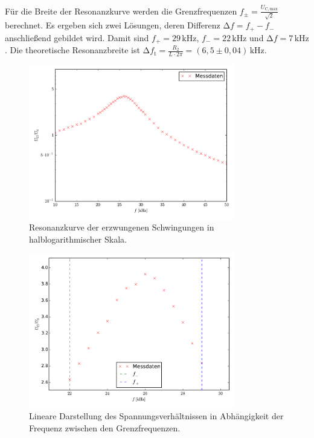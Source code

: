Für die Breite der Resonanzkurve werden die Grenzfrequenzen $f_\pm=\frac{U_\mathup{C,max}}{\sqrt{2}}$ berechnet. Es ergeben sich zwei Lösungen, deren Differenz $\mathup{\Delta}{f}=f_+-f_-$ anschließend gebildet wird. 
Damit sind $f_+=29\,\si{\kilo\hertz}$, $f_-=22\,\si{\kilo\hertz}$ und $\mathup{\Delta}{f}=7\,\si{\kilo\hertz}$. 
Die theoretische Resonanzbreite ist $\mathup{\Delta}{f_\mathup{t}}=\frac{R_2}{L\cdot2\pi}=(6,5\pm0,04)\,\si{\kilo\hertz}$. 
\begin{figure}[h]
		\centering
		\includegraphics[width=0.8\textwidth]{build/plot_amplitude_semilog.pdf}
		\caption{Resonanzkurve der erzwungenen Schwingungen in halblogarithmischer Skala.\cite{matplotlib}}
\end{figure}
\begin{figure}[h]
		\centering
		\includegraphics[width=0.8\textwidth]{build/plot_amplitude_linear.pdf}
		\caption{Lineare Darstellung des Spannungsverhältnissen in Abhängigkeit der Frequenz zwischen den Grenzfrequenzen.\cite{matplotlib}}
\end{figure}
